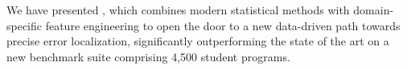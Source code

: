 \label{sec:conclusion}

We have presented \toolname, which
combines modern statistical methods
with domain-specific feature engineering
to open the door to a new data-driven
path towards precise error localization,
significantly outperforming the
state of the art on a new benchmark
suite comprising 4,500 student programs.
%



